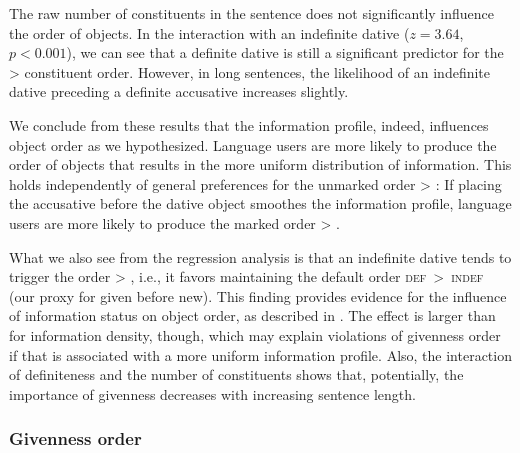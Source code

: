 \documentclass[output=paper,colorlinks,citecolor=brown]{langscibook}
\begin{document}
The raw number of constituents in the sentence does not significantly influence the order of objects. In the interaction with an indefinite dative ($z=3.64$, $p<0.001$), we can see that a definite dative is still a significant predictor for the \ReichDat{} > \ReichAcc{} constituent order. However, in long sentences, the likelihood of an indefinite dative preceding a definite accusative increases slightly.

We conclude from these results that the information profile, indeed, influences object order as we hypothesized. Language users are more likely to produce the order of objects that results in the more uniform distribution of information. This holds independently of general preferences for the unmarked order \ReichDat{} > \ReichAcc{}: If placing the accusative before the dative object smoothes the information profile, language users are more likely to produce the marked order \ReichAcc{} > \ReichDat{}.

What we also see from the regression analysis is that an indefinite dative tends to trigger the order \ReichAcc{} > \ReichDat{}, i.e., it favors maintaining the default order \textsc{def~>~indef} (our proxy for given before new). 
This finding provides evidence for the influence of information status on object order, as described in . The effect is larger than for information density, though, which may explain violations of givenness order if that is associated with a more uniform information profile. Also, the interaction of definiteness and the number of constituents shows that, potentially, the importance of givenness decreases with increasing sentence length.

\subsubsection{Givenness order}
\end{document}
